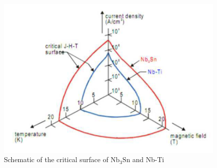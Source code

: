 
\begin{figure}[ht!]
\centering
\includegraphics[width=0.49\linewidth]{figures/introduction/critical_surface_scheme.png}
\caption{Schematic of the critical surface of $\text{Nb}_\text{3}\text{Sn}$ and Nb-Ti \cite{evans_marvel_of_technology}}
\label{fig:scheme_critical_surface}
\end{figure}